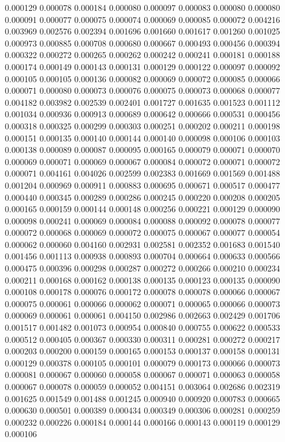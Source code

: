 0.000129
0.000078
0.000184
0.000080
0.000097
0.000083
0.000080
0.000080
0.000091
0.000077
0.000075
0.000074
0.000069
0.000085
0.000072
0.004216
0.003969
0.002576
0.002394
0.001696
0.001660
0.001617
0.001260
0.001025
0.000973
0.000885
0.000708
0.000680
0.000667
0.000493
0.000456
0.000394
0.000322
0.000272
0.000265
0.000262
0.000242
0.000241
0.000181
0.000188
0.000174
0.000149
0.000143
0.000131
0.000129
0.000122
0.000097
0.000092
0.000105
0.000105
0.000136
0.000082
0.000069
0.000072
0.000085
0.000066
0.000071
0.000080
0.000073
0.000076
0.000075
0.000073
0.000068
0.000077
0.004182
0.003982
0.002539
0.002401
0.001727
0.001635
0.001523
0.001112
0.001034
0.000936
0.000913
0.000689
0.000642
0.000666
0.000531
0.000456
0.000318
0.000325
0.000299
0.000303
0.000251
0.000202
0.000211
0.000198
0.000151
0.000135
0.000140
0.000144
0.000140
0.000098
0.000106
0.000103
0.000138
0.000089
0.000087
0.000095
0.000165
0.000079
0.000071
0.000070
0.000069
0.000071
0.000069
0.000067
0.000084
0.000072
0.000071
0.000072
0.000071
0.004161
0.004026
0.002599
0.002383
0.001669
0.001569
0.001488
0.001204
0.000969
0.000911
0.000883
0.000695
0.000671
0.000517
0.000477
0.000440
0.000345
0.000289
0.000286
0.000245
0.000220
0.000208
0.000205
0.000165
0.000159
0.000144
0.000148
0.000256
0.000221
0.000129
0.000090
0.000098
0.000241
0.000069
0.000084
0.000088
0.000092
0.000078
0.000077
0.000072
0.000068
0.000069
0.000072
0.000075
0.000067
0.000077
0.000054
0.000062
0.000060
0.004160
0.002931
0.002581
0.002352
0.001683
0.001540
0.001456
0.001113
0.000938
0.000893
0.000704
0.000664
0.000633
0.000566
0.000475
0.000396
0.000298
0.000287
0.000272
0.000266
0.000210
0.000234
0.000211
0.000168
0.000162
0.000138
0.000135
0.000123
0.000135
0.000090
0.000108
0.000178
0.000076
0.000172
0.000078
0.000078
0.000066
0.000067
0.000075
0.000061
0.000066
0.000062
0.000071
0.000065
0.000066
0.000073
0.000069
0.000061
0.000061
0.004150
0.002986
0.002663
0.002429
0.001706
0.001517
0.001482
0.001073
0.000954
0.000840
0.000755
0.000622
0.000533
0.000512
0.000405
0.000367
0.000330
0.000311
0.000281
0.000272
0.000217
0.000203
0.000200
0.000159
0.000165
0.000153
0.000137
0.000158
0.000131
0.000129
0.000378
0.000105
0.000101
0.000079
0.000173
0.000066
0.000073
0.000081
0.000067
0.000060
0.000058
0.000067
0.000071
0.000063
0.000058
0.000067
0.000078
0.000059
0.000052
0.004151
0.003064
0.002686
0.002319
0.001625
0.001549
0.001488
0.001245
0.000940
0.000920
0.000783
0.000665
0.000630
0.000501
0.000389
0.000434
0.000349
0.000306
0.000281
0.000259
0.000232
0.000226
0.000184
0.000144
0.000166
0.000143
0.000119
0.000129
0.000106
